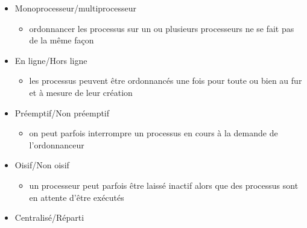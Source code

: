 \documentclass{beamer}
\begin{document}
{{\begin{itemize}
\item Monoprocesseur/multiprocesseur
\begin{itemize}
\item ordonnancer les processus sur un ou plusieurs processeurs ne se fait pas de la même façon
\end{itemize}
\item En ligne/Hors ligne
\begin{itemize}
\item les processus peuvent être ordonnancés une fois pour toute ou bien au fur et à mesure de leur création
\end{itemize}
\item Préemptif/Non préemptif
\begin{itemize}
\item on peut parfois interrompre un processus en cours à la demande de l'ordonnanceur
\end{itemize}
\item Oisif/Non oisif
\begin{itemize}
\item un processeur peut parfois être laissé inactif alors que des processus sont en attente d'être exécutés
\end{itemize}
\item Centralisé/Réparti
\end{itemize}

}

}
\end{document}
